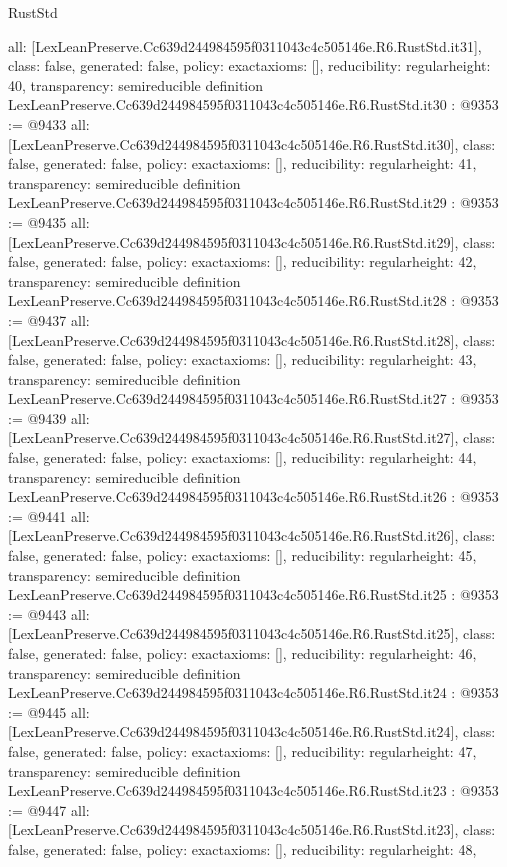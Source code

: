 \begin{lexlean}{RustStd}
\begin{coremodule}
{  all: [LexLeanPreserve.Cc639d244984595f0311043c4c505146e.R6.RustStd.it31],
  class: false,
  generated: false,
  policy: exact{axioms: []},
  reducibility: regular{height: 40},
  transparency: semireducible
}
definition LexLeanPreserve.Cc639d244984595f0311043c4c505146e.R6.RustStd.it30 : @9353 := @9433 {
  all: [LexLeanPreserve.Cc639d244984595f0311043c4c505146e.R6.RustStd.it30],
  class: false,
  generated: false,
  policy: exact{axioms: []},
  reducibility: regular{height: 41},
  transparency: semireducible
}
definition LexLeanPreserve.Cc639d244984595f0311043c4c505146e.R6.RustStd.it29 : @9353 := @9435 {
  all: [LexLeanPreserve.Cc639d244984595f0311043c4c505146e.R6.RustStd.it29],
  class: false,
  generated: false,
  policy: exact{axioms: []},
  reducibility: regular{height: 42},
  transparency: semireducible
}
definition LexLeanPreserve.Cc639d244984595f0311043c4c505146e.R6.RustStd.it28 : @9353 := @9437 {
  all: [LexLeanPreserve.Cc639d244984595f0311043c4c505146e.R6.RustStd.it28],
  class: false,
  generated: false,
  policy: exact{axioms: []},
  reducibility: regular{height: 43},
  transparency: semireducible
}
definition LexLeanPreserve.Cc639d244984595f0311043c4c505146e.R6.RustStd.it27 : @9353 := @9439 {
  all: [LexLeanPreserve.Cc639d244984595f0311043c4c505146e.R6.RustStd.it27],
  class: false,
  generated: false,
  policy: exact{axioms: []},
  reducibility: regular{height: 44},
  transparency: semireducible
}
definition LexLeanPreserve.Cc639d244984595f0311043c4c505146e.R6.RustStd.it26 : @9353 := @9441 {
  all: [LexLeanPreserve.Cc639d244984595f0311043c4c505146e.R6.RustStd.it26],
  class: false,
  generated: false,
  policy: exact{axioms: []},
  reducibility: regular{height: 45},
  transparency: semireducible
}
definition LexLeanPreserve.Cc639d244984595f0311043c4c505146e.R6.RustStd.it25 : @9353 := @9443 {
  all: [LexLeanPreserve.Cc639d244984595f0311043c4c505146e.R6.RustStd.it25],
  class: false,
  generated: false,
  policy: exact{axioms: []},
  reducibility: regular{height: 46},
  transparency: semireducible
}
definition LexLeanPreserve.Cc639d244984595f0311043c4c505146e.R6.RustStd.it24 : @9353 := @9445 {
  all: [LexLeanPreserve.Cc639d244984595f0311043c4c505146e.R6.RustStd.it24],
  class: false,
  generated: false,
  policy: exact{axioms: []},
  reducibility: regular{height: 47},
  transparency: semireducible
}
definition LexLeanPreserve.Cc639d244984595f0311043c4c505146e.R6.RustStd.it23 : @9353 := @9447 {
  all: [LexLeanPreserve.Cc639d244984595f0311043c4c505146e.R6.RustStd.it23],
  class: false,
  generated: false,
  policy: exact{axioms: []},
  reducibility: regular{height: 48},
}
\end{coremodule}
\end{lexlean}
